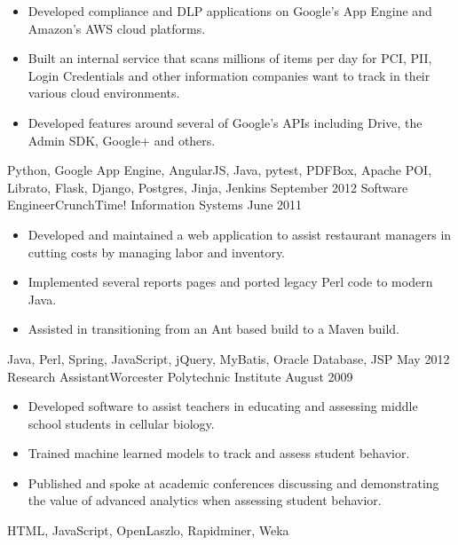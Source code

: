 \begin{experiences}
{\begin{itemize}
                        \item Developed compliance and DLP applications on Google's App Engine and Amazon's AWS cloud platforms.
                        \item Built an internal service that scans millions of items per day for PCI, PII, Login Credentials and other information companies want to track in their various cloud environments.
                        \item Developed features around several of Google's APIs including Drive, the Admin SDK, Google+ and others.
                      \end{itemize}
                  }
                  {Python, Google App Engine, AngularJS, Java, pytest, PDFBox, Apache POI, Librato, Flask, Django, Postgres, Jinja, Jenkins}
\emptySeparator
  \experience
  {September 2012}  {Software Engineer}{CrunchTime! Information Systems}
  {June 2011}   {
                      \begin{itemize}
                        \item Developed and maintained a web application to assist restaurant managers in cutting costs by managing labor and inventory.
                        \item Implemented several reports pages and ported legacy Perl code to modern Java.   
                        \item Assisted in transitioning from an Ant based build to a Maven build.
                      \end{itemize}
                  }
                  {Java, Perl, Spring, JavaScript, jQuery, MyBatis, Oracle Database, JSP}
\emptySeparator
\experience
  {May 2012}  {Research Assistant}{Worcester Polytechnic Institute}
  {August 2009}   {
                      \begin{itemize}
                        \item Developed software to assist teachers in educating and assessing middle school students in cellular biology.                                          
                        \item Trained machine learned models to track and assess student behavior.    
                        \item Published and spoke at academic conferences discussing and demonstrating the value of advanced analytics when assessing student behavior.
                      \end{itemize}
                  }
                  {HTML, JavaScript, OpenLaszlo, Rapidminer, Weka}  
\end{experiences}
